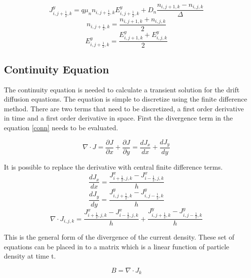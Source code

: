 \begin{doublespace}
\begin{equation}
J^y_{i,j+\frac{1}{2},k}=q\mu_n n_{i,j+\frac{1}{2},k} E^y_{i,j+\frac{1}{2},k}+D_n \frac{n_{i,j+1,k}-n_{i,j,k}}{\Delta}
\end{equation}
\begin{equation}\nonumber
n_{i,j+\frac{1}{2},k}=\frac{n_{i,j+1,k}+n_{i,j,k}}{2}
\end{equation}
\begin{equation}\nonumber
E^{y}_{i,j+\frac{1}{2},k}=\frac{E^y_{i,j+1,k}+E^y_{i,j,k}}{2}
\end{equation}


\clearpage
\subsection{Continuity Equation}
The continuity equation is needed to calculate a transient solution for the drift diffusion equations. The equation is simple to discretize using the finite difference method. There are two terms that need to be discretized, a first order derivative in time and a first order derivative in space. First the divergence term in the equation \eqref{conn} needs to be evaluated.

\begin{equation}
\nabla \cdot J=\frac{\partial J}{\partial x}+\frac{\partial J}{\partial y}=\frac{d J_x}{d x}+\frac{d J_y}{d y}
\end{equation}

It is possible to replace the derivative with central finite difference terms.
\begin{equation}
\frac{d J_x}{d x}=\frac{J^x_{i+\frac{1}{2},j,k}-J^x_{i-\frac{1}{2},j,k}}{h}
\end{equation}
\begin{equation}
\frac{d J_y}{d y}=\frac{J^y_{i,j+\frac{1}{2},k}-J^y_{i,j-\frac{1}{2},k}}{h}
\end{equation}
\begin{equation}
\nabla \cdot J_{i,j,k}=\frac{J^x_{i+\frac{1}{2},j,k}-J^x_{i-\frac{1}{2},j,k}}{h}+\frac{J^y_{i,j+\frac{1}{2},k}-J^y_{i,j-\frac{1}{2},k}}{h}
\label{delJ}
\end{equation}

This is the general form of the divergence of the current density. These set of equations can be placed in to a matrix which is a linear function of particle density at time t.

\begin{equation}
B = \nabla \cdot J_k 
\label{fd_div}
\end{equation}


\end{doublespace}
